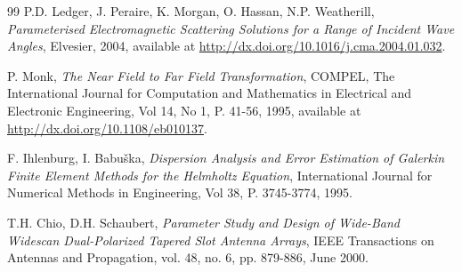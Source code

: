 \begin{thebibliography}{99}
 P.D. Ledger, J. Peraire, K. Morgan, O. Hassan, N.P. Weatherill, \emph{Parameterised Electromagnetic Scattering Solutions for a Range of Incident Wave Angles}, Elvesier, 2004, available at \url{http://dx.doi.org/10.1016/j.cma.2004.01.032}.

 P. Monk, \emph{The Near Field to Far Field Transformation}, COMPEL, The International Journal for Computation and Mathematics in Electrical and Electronic Engineering, Vol 14, No 1, P. 41-56, 1995, available at \url{http://dx.doi.org/10.1108/eb010137}.

 F. Ihlenburg, I. Babu\v{s}ka, \emph{Dispersion Analysis and Error Estimation of Galerkin Finite Element Methods for the Helmholtz Equation}, International Journal for Numerical Methods in Engineering, Vol 38, P. 3745-3774, 1995.

 T.H. Chio, D.H. Schaubert, \emph{Parameter Study and Design of Wide-Band Widescan Dual-Polarized Tapered Slot Antenna Arrays}, IEEE Transactions on Antennas and Propagation, vol. 48, no. 6, pp. 879-886, June 2000.

\end{thebibliography}
